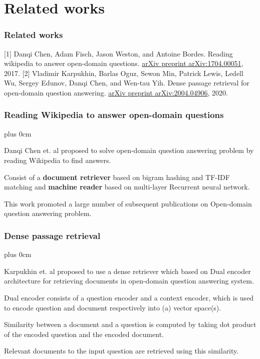 \documentclass[11pt]{beamer}
\renewcommand{\raggedright}{\leftskip=0pt \rightskip=0pt plus 0cm}
\let\olditemize=\itemize
\renewenvironment{itemize}{\olditemize\raggedright}{\endlist}
\begin{document}
\section{Related works}
\begin{frame}
\frametitle{Related works}
\begin{thebibliography}{10}
	[1] Danqi Chen, Adam Fisch, Jason Weston, and Antoine Bordes. Reading wikipedia to answer open-domain questions. \underline{arXiv preprint arXiv:1704.00051}, 2017.
	[2] Vladimir Karpukhin, Barlas Oguz, Sewon Min, Patrick Lewis, Ledell Wu, Sergey Edunov, Danqi Chen, and Wen-tau Yih. Dense passage retrieval for open-domain	question answering. \underline{arXiv preprint arXiv:2004.04906}, 2020.
\end{thebibliography}
\end{frame}
\begin{frame}
\frametitle{Reading Wikipedia to answer open-domain questions}
\begin{itemize}
	\item Danqi Chen et. al \cite{mrc} proposed to solve open-domain question answering problem by reading Wikipedia to find answers.
	\item Consist of a \textbf{document retriever} based on bigram hashing and TF-IDF matching and \textbf{machine reader} based on multi-layer Recurrent neural network.
	\item This work promoted a large number of subsequent publications on Open-domain question answering problem.
\end{itemize}
\end{frame}
\begin{frame}
\frametitle{Dense passage retrieval}
\begin{itemize}
	\item Karpukhin et. al \cite{dpr} proposed to use a dense retriever which based on Dual encoder architecture for retrieving documents in open-domain question answering system.
	\item Dual encoder consists of a question encoder and a context encoder, which is used to encode question and document respectively into (a) vector space(s).
	\item Similarity between a document and a question is computed by taking dot product of the encoded question and the encoded document.
	\item Relevant documents to the input question are retrieved using this similarity.
\end{itemize}
\end{frame}
\end{document}
